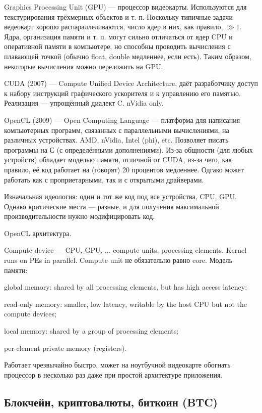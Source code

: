 \documentclass{book}
\begin{document}
Graphics Processing Unit (GPU) --- процессор видеокарты. Используются для
текстурирования трёхмерных объектов и т. п. Поскольку типичные задачи ведеокарт
хорошо распараллеливаются, число ядер в них, как правило, $\gg 1$. Ядра,
организация памяти
и т. п. могут сильно отличаться от ядер CPU и оперативной памяти в компьютере,
но способны проводить вычисления с плавающей точкой (обычно float, double
медленнее, если есть). Таким образом, некоторые вычисления можно переложить на
GPU.

CUDA (2007) --- Compute Unified Device Architecture, даёт разработчику доступ к
набору инструкций графического ускорителя и к управлению его памятью.
Реализация --- упрощённый диалект C. nVidia only.

OpenCL (2009) --- Open Computing Language --- платформа для написания
компьютерных программ, связанных с параллельными вычислениями, на различных
устройствах. AMD, nVidia, Intel (phi), etc. Позволяет писать программы на С (с
определёнными дополнениями). Из-за общности (для любых устройств) обладает
моделью памяти, отличной от CUDA, из-за чего, как правило, её код работает на
(говорят) 20 процентов медленнее. Одгако может работать как с проприетарными,
так и с открытыми драйверами.

Изначальная идеология: один и тот же код под все устройства, CPU, GPU. Однако
критические места --- разные, и для получения максимальной производительности
нужно модифицировать код.

OpenCL архитектура.

Compute device --- CPU, GPU, ... compute units, processing elements. Kernel runs
on PEs in parallel. Compute unit не обязательно равно core. Модель памяти:

global memory: shared by all processing elements, but has high access latency;

read-only memory: smaller, low latency, writable by the host CPU but not the
compute devices;

local memory: shared by a group of processing elements;

per-element private memory (registers).

Работает чрезвычайно быстро, может на ноутбучной видеокарте обогнать процессор в
несколько раз даже при простой архитектуре приложения.

\subsection{Блокчейн, криптовалюты, биткоин (BTC)}
\end{document}
